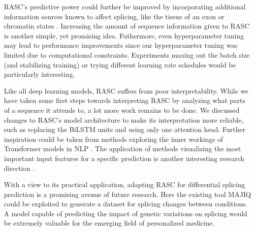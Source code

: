 RASC's predictive power could further be improved by incorporating additional information sources known to affect splicing, like the tissue of an exon or chromatin states \cite{chromatin}. Increasing the amount of sequence information given to RASC is another simple, yet promising idea. 
Futhermore, even hyperparameter tuning may lead to performance improvements since our hyperparameter tuning was limited due to computational constraints. Experiments maxing out the batch size (and stabilizing training) or trying different learning rate schedules would be particularly interesting. 


Like all deep learning models, RASC suffers from poor interpretability. While we have taken some first steps towards interpreting RASC by analyzing what parts of a sequence it attends to, a lot more work remains to be done. We discussed changes to RASC's model architecture to make its interpretation more reliable, such as replacing the BiLSTM units and using only one attention head. Further inspiration could be taken from methods exploring the inner workings of Transformer models in NLP \cite{interpretingbert}. The application of methods visualizing the most important input features for a specific prediction is another interesting research direction \cite{deeplift}. 
%

With a view to its practical application, adapting RASC for differential splicing prediction is a promising avenue of future research. Here the existing tool MAJIQ could be exploited to generate a dataset for splicing changes between conditions. A model capable of predicting the impact of genetic variations on splicing would be extremely valuable for the emerging field of personalized medicine.




%
%
% 
%
%
